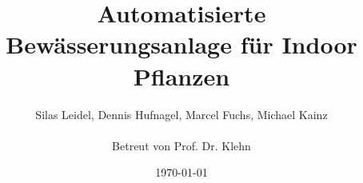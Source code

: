 \documentclass[
	12pt,
	a4paper,
	ngerman,
	oneside,
]{article}
\begin{document}
\begin{titlepage}

  \author{Silas Leidel, Dennis Hufnagel, Marcel Fuchs, Michael Kainz\\\\Betreut von Prof. Dr. Klehn}
  \title{Automatisierte Bewässerungsanlage für Indoor Pflanzen}
  \date{\today}
  \maketitle
\end{titlepage}

\newpage
\setcounter{page}{2}
\tableofcontents
\newpage










\cleardoublepage
{}
{}

\listoffigures
\end{document}
